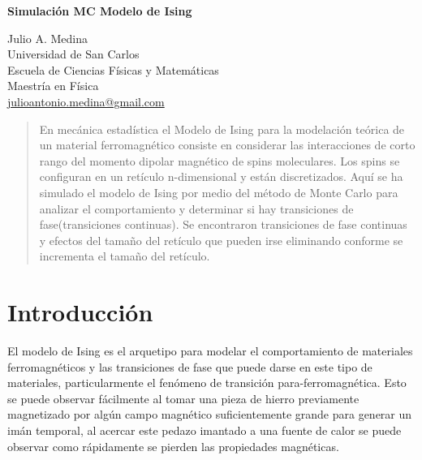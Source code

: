 \documentclass[a4paper]{article}
\begin{document}

\Large
 \begin{center}
\textbf{Simulación MC Modelo de Ising}\


\hspace{10pt}

\large
Julio A. Medina \\
\hspace{10pt}
\small  
 Universidad de San Carlos\\
Escuela de Ciencias Físicas y Matemáticas\\
Maestría en Física\\
\href{mailto:julioantonio.medina@gmail.com}{julioantonio.medina@gmail.com}\\

\end{center}

\hspace{10pt}

\begin{abstract}
En mecánica estadística el Modelo de Ising para la modelación teórica de un material ferromagnético consiste en considerar las interacciones de corto rango del momento dipolar magnético de spins moleculares. Los spins se configuran en un retículo n-dimensional y están discretizados. Aquí se ha simulado el modelo de Ising por medio del método de Monte Carlo para analizar el comportamiento y determinar si hay transiciones de fase(transiciones continuas). Se encontraron transiciones de fase continuas y efectos del tamaño del retículo que pueden irse eliminando conforme se incrementa el tamaño del retículo.

\end{abstract}

\normalsize
\section{Introducción}
El modelo de Ising es el arquetipo para modelar el comportamiento de materiales ferromagnéticos y las transiciones de fase que puede darse en este tipo de materiales, particularmente el fenómeno de transición para-ferromagnética. Esto se puede observar fácilmente al tomar una pieza de hierro previamente magnetizado por algún campo magnético suficientemente grande para generar un imán temporal, al acercar este pedazo imantado a una fuente de calor se puede observar como rápidamente se pierden las propiedades magnéticas.
\end{document}
